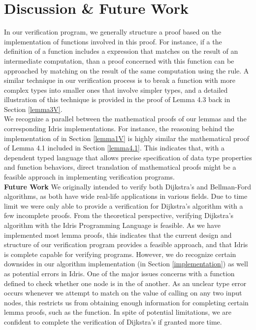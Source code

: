 \section{Discussion \& Future Work}
In our verification program, we generally structure a proof based on the implementation of functions involved in this proof. For instance, if a the definition of a function includes a  expression that matches on the result of an intermediate computation, than a proof concerned with this function can be approached by matching on the result of the same computation using the  rule. A similar technique in our verification process is to break a function with more complex types into smaller ones that involve simpler types, and a detailed illustration of this technique is provided in the proof of Lemma 4.3 back in Section \ref{lemma3V}.
\\

We recognize a parallel between the mathematical proofs of our lemmas and the corresponding Idris implementations. For instance, the reasoning behind the implementation of  in Section \ref{lemma1V} is highly similar the mathematical proof of Lemma 4.1 included in Section \ref{lemma4.1}. This indicates that, with a dependent typed language that allows precise specification of data type properties and function behaviors, direct translation of mathematical proofs might be a feasible approach in implementing verification programs. 
\\

\textbf{Future Work} We originally intended to verify both Dijkstra's and Bellman-Ford algorithms, as both have wide real-life applications in various fields. Due to time limit we were only able to provide a verification for Dijkstra's algorithm with a few incomplete proofs. From the theoretical perspective, verifying Dijkstra's algorithm with the Idris Programming Language is feasible. As we have implemented most lemma proofs, this indicates that the current design and structure of our verification program provides a feasible approach, and that Idris is complete capable for verifying programs. However, we do recognize certain downsides in our algorithm implementation (in Section \ref{implementation}) as well as potential errors in Idris. One of the major issues concerns with a  function defined to check whether one node is in the  of another. As an unclear type error occurs whenever we attempt to match on the value of calling  on any two input nodes, this restricts us from obtaining enough information for completing certain lemma proofs, such as the  function. In spite of potential limitations, we are confident to complete the verification of Dijkstra's if granted more time. 


